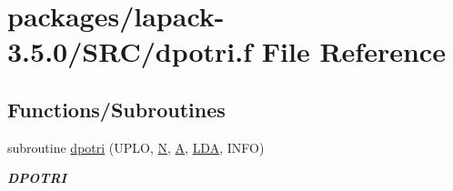 \hypertarget{dpotri_8f}{}\section{packages/lapack-\/3.5.0/\+S\+R\+C/dpotri.f File Reference}
\label{dpotri_8f}
\subsection*{Functions/\+Subroutines}
\begin{DoxyCompactItemize}
\item 
subroutine \hyperlink{group__doublePOcomputational_ga9dfc04beae56a3b1c1f75eebc838c14c}{dpotri} (U\+P\+L\+O, \hyperlink{polmisc_8c_a0240ac851181b84ac374872dc5434ee4}{N}, \hyperlink{classA}{A}, \hyperlink{example__user_8c_ae946da542ce0db94dced19b2ecefd1aa}{L\+D\+A}, I\+N\+F\+O)
\begin{DoxyCompactList}\small\item\em {\bfseries D\+P\+O\+T\+R\+I} \end{DoxyCompactList}\end{DoxyCompactItemize}
